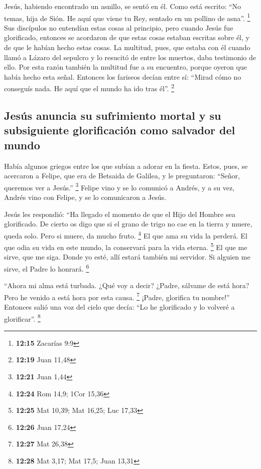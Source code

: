  Jesús, habiendo encontrado un asnillo, se sentó en él.
Como está escrito:  ``No temas, hija de Sión. He aquí que
viene tu Rey, sentado en un pollino de asna''. \footnote{\textbf{12:15}
  Zacarías 9:9}  Sus discípulos no entendían estas cosas
al principio, pero cuando Jesús fue glorificado, entonces se acordaron
de que estas cosas estaban escritas sobre él, y de que le habían hecho
estas cosas.  La multitud, pues, que estaba con él cuando
llamó a Lázaro del sepulcro y lo resucitó de entre los muertos, daba
testimonio de ello.  Por esta razón también la multitud
fue a su encuentro, porque oyeron que había hecho esta señal.
 Entonces los fariseos decían entre sí: ``Mirad cómo no
conseguís nada. He aquí que el mundo ha ido tras él''. \footnote{\textbf{12:19}
  Juan 11,48}

\hypertarget{jesuxfas-anuncia-su-sufrimiento-mortal-y-su-subsiguiente-glorificaciuxf3n-como-salvador-del-mundo}{%
\subsection{Jesús anuncia su sufrimiento mortal y su subsiguiente
glorificación como salvador del
mundo}\label{jesuxfas-anuncia-su-sufrimiento-mortal-y-su-subsiguiente-glorificaciuxf3n-como-salvador-del-mundo}}

 Había algunos griegos entre los que subían a adorar en
la fiesta.  Estos, pues, se acercaron a Felipe, que era
de Betsaida de Galilea, y le preguntaron: ``Señor, queremos ver a
Jesús.'' \footnote{\textbf{12:21} Juan 1,44}  Felipe vino
y se lo comunicó a Andrés, y a su vez, Andrés vino con Felipe, y se lo
comunicaron a Jesús.

 Jesús les respondió: ``Ha llegado el momento de que el
Hijo del Hombre sea glorificado.  De cierto os digo que
si el grano de trigo no cae en la tierra y muere, queda solo. Pero si
muere, da mucho fruto. \footnote{\textbf{12:24} Rom 14,9; 1Cor 15,36}
 El que ama su vida la perderá. El que odia su vida en
este mundo, la conservará para la vida eterna. \footnote{\textbf{12:25}
  Mat 10,39; Mat 16,25; Luc 17,33}  El que me sirve, que
me siga. Donde yo esté, allí estará también mi servidor. Si alguien me
sirve, el Padre lo honrará. \footnote{\textbf{12:26} Juan 17,24}

 ``Ahora mi alma está turbada. ¿Qué voy a decir? ¿Padre,
sálvame de está hora? Pero he venido a está hora por esta causa.
\footnote{\textbf{12:27} Mat 26,38}  ¡Padre, glorifica tu
nombre!'' Entonces salió una voz del cielo que decía: ``Lo he
glorificado y lo volveré a glorificar''. \footnote{\textbf{12:28} Mat
  3,17; Mat 17,5; Juan 13,31}

